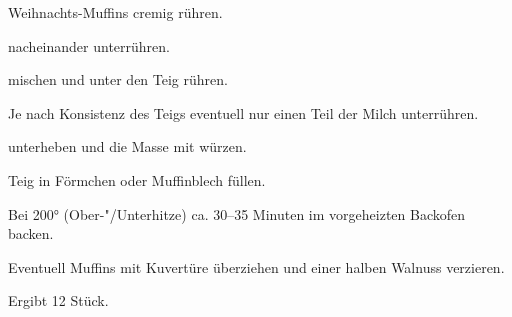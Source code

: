 \begin{recipe}{Weihnachts-Muffins}
  cremig rühren.
  
  nacheinander unterrühren.
  
  mischen und unter den Teig rühren.
  
  Je nach Konsistenz des Teigs eventuell nur einen Teil der Milch
  unterrühren.
  
  unterheben und die Masse mit
  würzen.

  Teig in Förmchen oder Muffinblech füllen.

  Bei 200° (Ober-"/Unterhitze) ca. 30--35 Minuten im vorgeheizten
  Backofen backen.

  Eventuell Muffins mit Kuvertüre überziehen und einer halben Walnuss
  verzieren.

  Ergibt 12 Stück.
\end{recipe}
